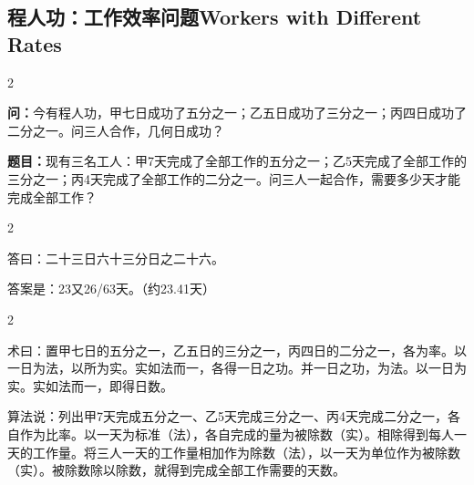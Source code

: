 \documentclass[11pt,a4paper]{article}
\newcommand{\bilingualsubsection}[2]{%
  \subsection{#1\hfill\normalfont\normalsize\color{sectioncolor}#2}%
}
\begin{document}
\bilingualsubsection{程人功：工作效率问题}{Workers with Different Rates}

\begin{paracol}{2}

\begin{problembox}
\textbf{问：}今有程人功，甲七日成功了五分之一；乙五日成功了三分之一；丙四日成功了二分之一。问三人合作，几何日成功？
\end{problembox}

\switchcolumn

\begin{problembox}
\textbf{题目：}现有三名工人：甲7天完成了全部工作的五分之一；乙5天完成了全部工作的三分之一；丙4天完成了全部工作的二分之一。问三人一起合作，需要多少天才能完成全部工作？
\end{problembox}

\end{paracol}

\vspace{0.2cm}

\begin{paracol}{2}

\begin{answerbox}[\CJKfamily{rm}答 · 原文]
答曰：二十三日六十三分日之二十六。
\end{answerbox}

\switchcolumn

\begin{answerbox}[白话文：答案]
答案是：23又26/63天。（约23.41天）
\end{answerbox}

\end{paracol}

\vspace{0.2cm}

\begin{paracol}{2}

\begin{methodbox}[\CJKfamily{rm}术 · 原文]
术曰：置甲七日的五分之一，乙五日的三分之一，丙四日的二分之一，各为率。以一日为法，以所为实。实如法而一，各得一日之功。并一日之功，为法。以一日为实。实如法而一，即得日数。
\end{methodbox}

\switchcolumn

\begin{methodbox}
算法说：列出甲7天完成五分之一、乙5天完成三分之一、丙4天完成二分之一，各自作为比率。以一天为标准（法），各自完成的量为被除数（实）。相除得到每人一天的工作量。将三人一天的工作量相加作为除数（法），以一天为单位作为被除数（实）。被除数除以除数，就得到完成全部工作需要的天数。
\end{methodbox}

\end{paracol}
\end{document}
